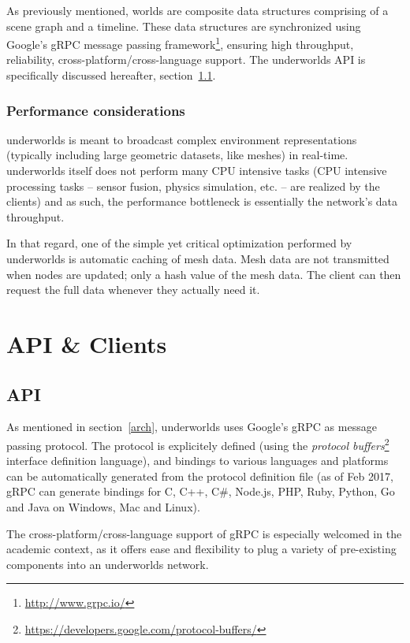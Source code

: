 \documentclass[letterpaper, 10 pt, conference]{ieeeconf}  %
\newcommand{\uwds}{{\sc underworlds}\xspace}
\begin{document}
As previously mentioned, worlds are composite data structures comprising of a
scene graph and a timeline. These data structures are synchronized using
Google's gRPC message passing framework\footnote{\url{http://www.grpc.io/}}, ensuring
high throughput, reliability, cross-platform/cross-language support. The \uwds
API is specifically discussed hereafter, section~\ref{api}.


\subsubsection*{Performance considerations}

\uwds is meant to broadcast complex environment representations (typically
including large geometric datasets, like meshes) in real-time. \uwds itself does
not perform many CPU intensive tasks (CPU intensive processing tasks -- sensor fusion, physics
simulation, etc. -- are realized by the clients) and as such, the performance
bottleneck is essentially the network's data throughput.

In that regard, one of the simple yet critical optimization performed by \uwds
is automatic caching of mesh data. Mesh data are not transmitted when nodes are
updated; only a hash value of the mesh data. The client can then request the
full data whenever they actually need it.



\section{API \& Clients}

\subsection{API}
\label{api}

As mentioned in section~\ref{arch}, \uwds uses Google's gRPC as message passing
protocol. The protocol is explicitely defined (using the \emph{protocol
buffers}\footnote{\url{https://developers.google.com/protocol-buffers/}}
interface definition language), and bindings to various languages
and platforms can be automatically generated from the protocol definition file
(as of Feb 2017, gRPC can generate bindings for C, C++, C\#, Node.js, PHP, Ruby,
Python, Go and Java on Windows, Mac and Linux).

The cross-platform/cross-language support of gRPC is especially welcomed in the
academic context, as it offers ease and flexibility to plug a variety of
pre-existing components into an \uwds network.
\end{document}
